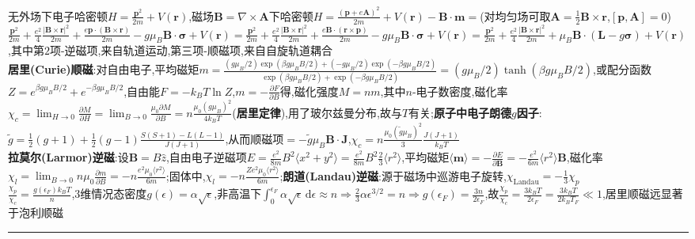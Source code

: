 \documentclass[UTF8,10pt,a4paper]{article}
\providecommand{\abs}[1]{\lvert#1\rvert}
\begin{document}
\begin{multicols}{2}
无外场下电子哈密顿$H=\frac{\bm{p}^2}{2m}+V(\bm{r})$,磁场$\bm{B}=\nabla\times\bm{A}$下哈密顿$H=\frac{(\bm{p}+e\bm{A})^2}{2m}+V(\bm{r})-\bm{B}\cdot\bm{m}=$(对均匀场可取$\bm{A}=\frac{1}{2}\bm{B}\times\bm{r}$,$[\bm{p},\bm{A}]=0$)$\frac{\bm{p}^2}{2m}+\frac{e^2}{4}\frac{\abs{\bm{B}\times\bm{r}}^2}{2m}+\frac{e\bm{p}\cdot(\bm{B}\times\bm{r})}{2m}-g\mu_B\bm{B}\cdot\bm{\sigma}+V(\bm{r})=\frac{\bm{p}^2}{2m}+\frac{e^2}{4}\frac{\abs{\bm{B}\times\bm{r}}^2}{2m}+\frac{e\bm{B}\cdot(\bm{r}\times\bm{p})}{2m}-g\mu_B\bm{B}\cdot\bm{\sigma}+V(\bm{r})=\frac{\bm{p}^2}{2m}+\frac{e^2}{4}\frac{\abs{\bm{B}\times\bm{r}}^2}{2m}+\mu_B\bm{B}\cdot(\bm{L}-g\bm{\sigma})+V(\bm{r})$,其中第$2$项-逆磁项,来自轨道运动,第三项-顺磁项,来自自旋轨道耦合\\
\textbf{居里(Curie)顺磁}:对自由电子,平均磁矩$m=\frac{(g\mu_B/2)\exp(\beta g\mu_BB/2)+(-g\mu_B/2)\exp(-\beta g\mu_BB/2)}{\exp(\beta g\mu_BB/2)+\exp(-\beta g\mu_BB/2)}=(g\mu_B/2)\tanh(\beta g\mu_BB/2)$,或配分函数$Z=e^{\beta g\mu_BB/2}+e^{-\beta g\mu_BB/2}$,自由能$F=-k_BT\ln Z$,$m=-\frac{\partial F}{\partial B}$得,磁化强度$M=nm$,其中$n$-电子数密度,磁化率$\chi_c=\lim_{H\rightarrow 0}\frac{\partial M}{\partial H}=\lim_{B\rightarrow 0}\frac{\mu_0\partial M}{\partial B}=n\frac{\mu_0(g\mu_B)^2}{4k_BT}$(\textbf{居里定律}),用了玻尔兹曼分布,故与$T$有关;\textbf{原子中电子朗德$g$因子}:$\tilde{g}=\frac{1}{2}(g+1)+\frac{1}{2}(g-1)\frac{S(S+1)-L(L-1)}{J(J+1)}$,从而顺磁项$=-\tilde{g}\mu_B\bm{B}\cdot\bm{J}$,$\chi_c=n\frac{\mu_0(\tilde{g}\mu_B)^2}{3}\frac{J(J+1)}{k_BT}$\\
\textbf{拉莫尔(Larmor)逆磁}:设$\bm{B}=B\hat{z}$,自由电子逆磁项$E=\frac{e^2}{8m}B^2\langle x^2+y^2\rangle=\frac{e^2}{8m}B^2\frac{2}{3}\langle r^2\rangle$,平均磁矩$\langle\bm{m}\rangle=-\frac{\partial E}{\partial\bm{B}}=-\frac{e^2}{6m}\langle r^2\rangle\bm{B}$,磁化率$\chi_l=\lim_{B\rightarrow 0}n\mu_0\frac{\partial m}{\partial B}=-n\frac{e^2\mu_0\langle r^2\rangle}{6m}$;固体中,$\chi_l=-n\frac{Ze^2\mu_0\langle r^2\rangle}{6m}$;\textbf{朗道(Landau)逆磁}:源于磁场中巡游电子旋转,$\chi_{\text{Landau}}=-\frac{1}{3}\chi_p$\\
$\frac{\chi_p}{\chi_c}=\frac{g(\epsilon_F)k_BT}{n}$,$3$维情况态密度$g(\epsilon)=\alpha\sqrt{\epsilon}$,非高温下$\int_0^{\epsilon_F}\alpha\sqrt{\epsilon}\,\mathrm{d}\epsilon\approx n\Rightarrow\frac{2}{3}\alpha\epsilon^{3/2}=n\Rightarrow g(\epsilon_F)=\frac{3n}{2\epsilon_F}$,故$\frac{\chi_p}{\chi_c}=\frac{3k_BT}{2\epsilon_F}=\frac{3k_BT}{2k_BT_F}\ll 1$,居里顺磁远显著于泡利顺磁\\
\rule{\columnwidth}{.2pt}\\

\end{multicols}
\end{document}
